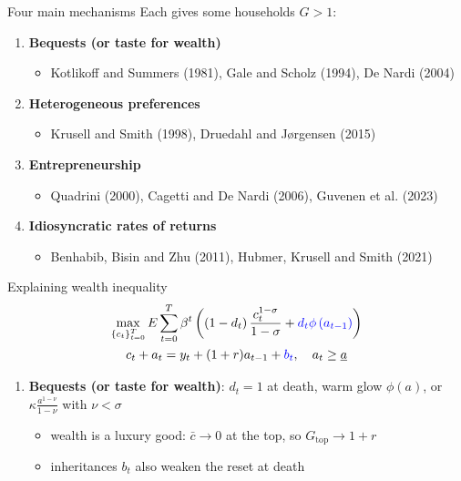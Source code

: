 \documentclass[10pt,english,10pt,handout]{beamer}
\begin{document}
\begin{frame}{Four main mechanisms}
Each gives some households $G>1$:
\begin{enumerate}
\item \textbf{Bequests (or taste for wealth)}
\begin{itemize}
\item Kotlikoff and Summers (1981), Gale and Scholz (1994), De Nardi (2004)
\end{itemize}
\item \textbf{Heterogeneous preferences}
\begin{itemize}
\item Krusell and Smith (1998), Druedahl and Jørgensen (2015)
\end{itemize}
\item \textbf{Entrepreneurship}
\begin{itemize}
\item Quadrini (2000), Cagetti and De Nardi (2006), Guvenen et al. (2023)
\end{itemize}
\item \textbf{Idiosyncratic rates of returns}
\begin{itemize}
\item Benhabib, Bisin and Zhu (2011), Hubmer, Krusell and Smith (2021)
\end{itemize}
\end{enumerate}
\end{frame}

\begin{frame}{Explaining wealth inequality}
\[
\begin{gathered}\max_{\left\{ c_{t}\right\} _{t=0}^{T}}E\sum_{t=0}^{T}\beta^{t}\left(\left(1-d_{t}\right)\frac{c_{t}^{1-\sigma}}{1-\sigma}+\textcolor{blue}{d_{t}\phi\left(a_{t-1}\right)}\right)\\
c_{t}+a_{t}=y_{t}+(1+r)a_{t-1}+\textcolor{blue}{b_{t}},\quad a_{t}\geq\underline{a}
\end{gathered}
\]
\begin{enumerate}
\item \textbf{Bequests (or taste for wealth)}: $d_{t}=1$ at death, warm glow $\phi(a)$, or $\kappa\frac{a^{1-\nu}}{1-\nu}$ with $\nu<\sigma$
\begin{itemize}
\item wealth is a luxury good: $\bar{c}\to0$ at the top, so $G_{\text{top}}\to1+r$
\item inheritances $b_{t}$ also weaken the reset at death
\end{itemize}
\end{enumerate}
\end{frame}
\end{document}
